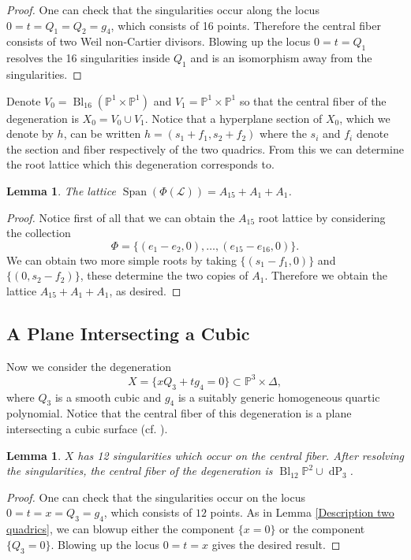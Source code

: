 \documentclass[a4paper]{amsart}
\theoremstyle{definition}
\theoremstyle{plain}
\newtheorem{lemma}[defn]{Lemma}
\theoremstyle{remark}
\newcommand{\PS}{\mathbb{P}}
\begin{document}
\begin{proof}
One can check that the singularities occur along the locus $0=t=Q_1=Q_2=g_4$, which consists of 16 points. Therefore the central fiber consists of two Weil non-Cartier divisors. Blowing up the locus $0=t=Q_1$ resolves the 16 singularities inside $Q_1$ and is an isomorphism away from the singularities. 
\end{proof}

Denote $V_0 = \operatorname{Bl}_{16}(\PS^1\times\PS^1)$ and $V_1 = \PS^1\times\PS^1$ so that the central fiber of the degeneration is $X_0 = V_0\cup V_1$. Notice that a hyperplane section of $X_0$, which we denote by $h$, can be written $h=(s_1+f_1,s_2+f_2)$ where the $s_i$ and $f_i$ denote the section and fiber respectively of the two quadrics. From this we can determine the root lattice which this degeneration corresponds to.

\begin{lemma}
The lattice $\operatorname{Span}(\Phi(\mathscr{L})) = A_{15}+A_1+A_1$.
\end{lemma}

\begin{proof}
Notice first of all that we can obtain the $A_{15}$ root lattice by considering the collection
$$\Phi = \{(e_1-e_2,0), \dots, (e_{15}-e_{16},0)\}.$$
We can obtain two more simple roots by taking $\{(s_1-f_1,0)\}$ and $\{(0,s_2-f_2)\}$, these determine the two copies of $A_1$. Therefore we obtain the lattice $A_{15}+A_1+A_1$, as desired.
\end{proof}

\subsection{A Plane Intersecting a Cubic}\label{sect:Plane and Cubic}
Now we consider the degeneration 
$$X = \{xQ_3 +tg_4=0\} \subset \mathbb{P}^3 \times \Delta, $$
where $Q_3$ is a smooth cubic and $g_4$ is a suitably generic homogeneous quartic polynomial. Notice that the central fiber of this degeneration is a plane intersecting a cubic surface (cf. \cite[Case SS-5]{Shah81}).

\begin{lemma}
$X$ has 12 singularities which occur on the central fiber. After resolving the singularities, the central fiber of the degeneration is $\operatorname{Bl}_{12}\PS^2\cup \operatorname{dP}_3$.
\end{lemma}

\begin{proof}
One can check that the singularities occur on the locus $0=t=x=Q_3=g_4$, which consists of $12$ points. As in Lemma \ref{Description two quadrics}, we can blowup either the component $\{x=0\}$ or the component $\{Q_3=0\}$. Blowing up the locus $0=t=x$ gives the desired result.
\end{proof}
\end{document}
